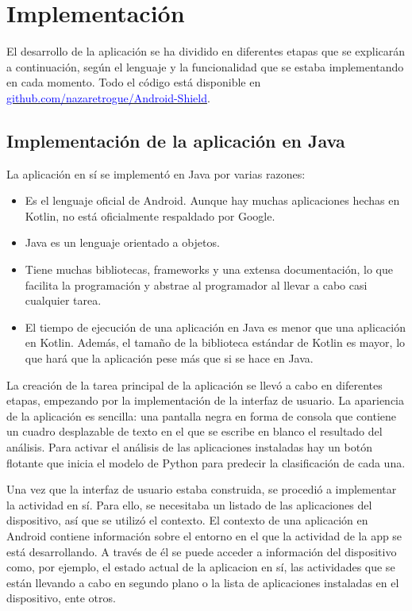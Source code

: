 \chapter{Implementación}
\label{cap6}

El desarrollo de la aplicación se ha dividido en diferentes etapas que se explicarán a continuación, según el lenguaje y la funcionalidad que se estaba implementando en cada momento. Todo el código está disponible en \href{https://github.com/nazaretrogue/Android-Shield}{\textcolor{blue}{github.com/nazaretrogue/Android-Shield}}.

\section{Implementación de la aplicación en Java}

La aplicación en sí se implementó en Java por varias razones:

\begin{itemize}
	\item Es el lenguaje oficial de Android. Aunque hay muchas aplicaciones hechas en Kotlin, no está oficialmente respaldado por Google.
	\item Java es un lenguaje orientado a objetos.
	\item Tiene muchas bibliotecas, frameworks y una extensa documentación, lo que facilita la programación y abstrae al programador al llevar a cabo casi cualquier tarea.
	\item El tiempo de ejecución de una aplicación en Java es menor que una aplicación en Kotlin. Además, el tamaño de la biblioteca estándar de Kotlin es mayor, lo que hará que la aplicación pese más que si se hace en Java.
\end{itemize}

La creación de la tarea principal de la aplicación se llevó a cabo en diferentes etapas, empezando por la implementación de la interfaz de usuario. La apariencia de la aplicación es sencilla: una pantalla negra en forma de consola que contiene un cuadro desplazable de texto en el que se escribe en blanco el resultado del análisis. Para activar el análisis de las aplicaciones instaladas hay un botón flotante que inicia el modelo de Python para predecir la clasificación de cada una.

Una vez que la interfaz de usuario estaba construida, se procedió a implementar la actividad en sí. Para ello, se necesitaba un listado de las aplicaciones del dispositivo, así que se utilizó el contexto. El contexto de una aplicación en Android contiene información sobre el entorno en el que la actividad de la app se está desarrollando. A través de él se puede acceder a información del dispositivo como, por ejemplo, el estado actual de la aplicacion en sí, las actividades que se están llevando a cabo en segundo plano o la lista de aplicaciones instaladas en el dispositivo, ente otros.

